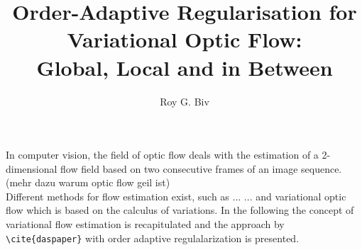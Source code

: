 \documentclass[journal]{vgtc}
\author{Roy G. Biv}
\title{Order-Adaptive Regularisation for Variational Optic Flow:\\Global, Local and in Between}
\begin{document}


\maketitle

In computer vision, the field of optic flow deals with the estimation of a 2-dimensional flow field based on two consecutive frames of an image sequence.
\\(mehr dazu warum optic flow geil ist)\\
Different methods for flow estimation exist, such as ... ... and variational optic flow which is based on the calculus of variations.
In the following the concept of variational flow estimation is recapitulated and the approach by \verb|\cite{daspaper}| with order adaptive regulalarization is presented.
\end{document}
